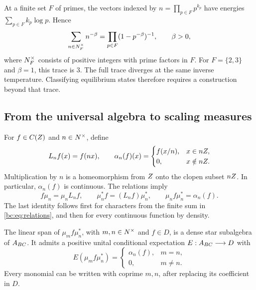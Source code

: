 At a finite set \(F\) of primes, the vectors indexed by
\(n=\prod_{p\in F}p^{k_p}\) have energies \(\sum_{p\in F}k_p\log p\).
Hence
\begin{equation}\label{bc:eq:finite-trace}
 \sum_{n\in N^{\times}_F}n^{-\beta}
   =\prod_{p\in F}(1-p^{-\beta})^{-1},\qquad \beta>0,
\end{equation}
where \(N^{\times}_F\) consists of positive integers with prime factors in \(F\).
For \(F=\{2,3\}\) and \(\beta=1\), this trace is \(3\).
The full trace diverges at the same inverse temperature. Classifying
equilibrium states therefore requires a construction beyond that trace.

\subsection{From the universal algebra to scaling measures}

For \(f\in C(Z)\) and \(n\in N^{\times}\), define
\begin{equation}\label{bc:eq:alpha}
 L_nf(x)=f(nx),\qquad
 \alpha_n(f)(x)=
 \begin{cases}f(x/n),&x\in nZ,\\0,&x\notin nZ.
 \end{cases}
\end{equation}
Multiplication by \(n\) is a homeomorphism from \(Z\) onto the
clopen subset \(nZ\). In particular, \(\alpha_n(f)\) is continuous.
The relations imply
\begin{equation}\label{bc:eq:covariance}
 f\mu_n=\mu_nL_nf,\qquad
 \mu_n^*f=(L_nf)\mu_n^*,\qquad
 \mu_nf\mu_n^*=\alpha_n(f).
\end{equation}
The last identity follows first for characters from the finite sum in
\eqref{bc:eq:relations}, and then for every continuous function by density.

\begin{lemma}\label{bc:lem:expectation}
The linear span of \(\mu_mf\mu_n^*\), with \(m,n\in N^{\times}\) and
\(f\in D\), is a dense star subalgebra of \(A_{BC}\). It admits a
positive unital conditional expectation \(E:A_{BC}\longrightarrow D\)
with
\begin{equation}\label{bc:eq:expectation}
 E(\mu_mf\mu_n^*)=\begin{cases}\alpha_n(f),&m=n,\\0,&m\ne n.
 \end{cases}
\end{equation}
Every monomial can be written with coprime \(m,n\), after replacing
its coefficient in \(D\).
\end{lemma}

